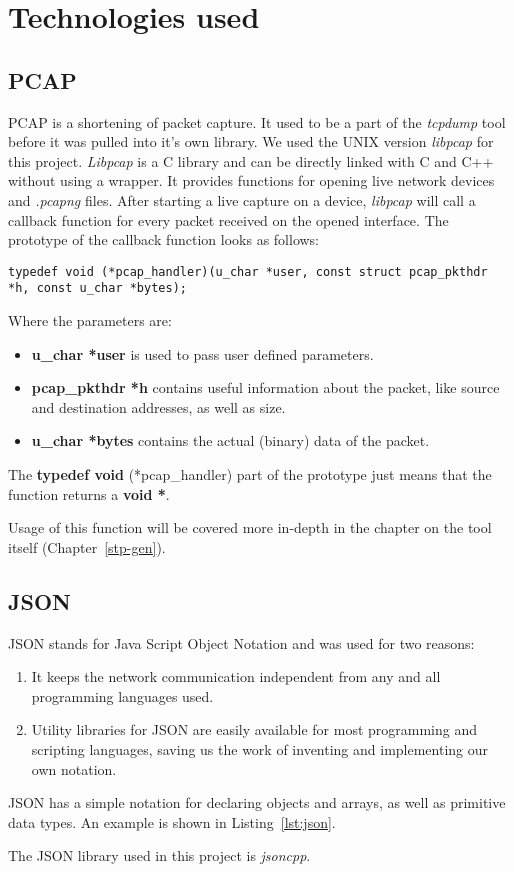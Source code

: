 \section{Technologies used}
\subsection*{PCAP}
\label{pcap}
PCAP is a shortening of packet capture.
It used to be a part of the \textit{tcpdump} tool before it was pulled into it's own library.
We used the UNIX version \textit{libpcap} for this project.
\textit{Libpcap} is a C library and can be directly linked with C and C++ without using a wrapper.
It provides functions for opening live network devices and \textit{.pcapng} files.
After starting a live capture on a device, \textit{libpcap} will call a callback function for every packet received on the opened interface.
The prototype of the callback function looks as follows:
\begin{lstlisting}[caption=Pcap Callback Prototype]
typedef void (*pcap_handler)(u_char *user, const struct pcap_pkthdr *h, const u_char *bytes);
\end{lstlisting}
Where the parameters are:
\begin{itemize}
    \item \textbf{u\_char *user} is used to pass user defined parameters.
    \item \textbf{pcap\_pkthdr *h} contains useful information about the packet, like source and destination addresses, as well as size.
    \item \textbf{u\_char *bytes} contains the actual (binary) data of the packet.
\end{itemize}
The \textbf{typedef void} (*pcap\_handler) part of the prototype just means that the function returns a \textbf{void *}.

Usage of this function will be covered more in-depth in the chapter on the tool itself (Chapter~\ref{stp-gen}).
\subsection*{JSON}
\label{json}
JSON stands for Java Script Object Notation and was used for two reasons:
\begin{enumerate}
    \item It keeps the network communication independent from any and all programming languages used.
    \item Utility libraries for JSON are easily available for most programming and scripting languages, saving us the work of inventing and implementing our own notation.
\end{enumerate}
JSON has a simple notation for declaring objects and arrays, as well as primitive data types.
An example is shown in Listing~\ref{lst:json}.

The JSON library used in this project is \textit{jsoncpp}\cite{jsoncpp}.

